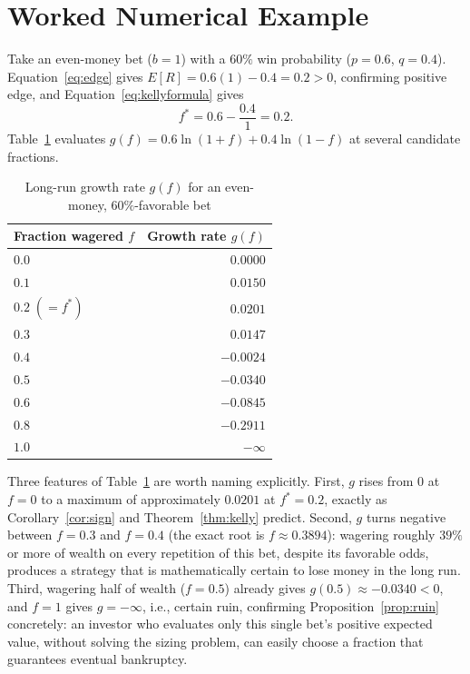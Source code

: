 \documentclass[11pt]{article}
\theoremstyle{remark}
\theoremstyle{definition}
\begin{document}
\section{Worked Numerical Example}
\label{sec:example}

Take an even-money bet ($b=1$) with a $60\%$ win probability ($p=0.6$, $q=0.4$). Equation~\eqref{eq:edge} gives $E[R] = 0.6(1)-0.4 = 0.2>0$, confirming positive edge, and Equation~\eqref{eq:kellyformula} gives
\begin{equation}
f^{*} = 0.6 - \frac{0.4}{1} = 0.2.
\end{equation}
Table~\ref{tab:growth} evaluates $g(f) = 0.6\ln(1+f) + 0.4\ln(1-f)$ at several candidate fractions.

\begin{table}[htbp]
\centering
\caption{Long-run growth rate $g(f)$ for an even-money, $60\%$-favorable bet}
\label{tab:growth}
\begin{tabular}{@{}lr@{}}
\toprule
Fraction wagered $f$ & Growth rate $g(f)$ \\
\midrule
$0.0$ & $0.0000$ \\
$0.1$ & $0.0150$ \\
$0.2\;(=f^{*})$ & $0.0201$ \\
$0.3$ & $0.0147$ \\
$0.4$ & $-0.0024$ \\
$0.5$ & $-0.0340$ \\
$0.6$ & $-0.0845$ \\
$0.8$ & $-0.2911$ \\
$1.0$ & $-\infty$ \\
\bottomrule
\end{tabular}
\end{table}

Three features of Table~\ref{tab:growth} are worth naming explicitly. First, $g$ rises from $0$ at $f=0$ to a maximum of approximately $0.0201$ at $f^{*}=0.2$, exactly as Corollary~\ref{cor:sign} and Theorem~\ref{thm:kelly} predict. Second, $g$ turns negative between $f=0.3$ and $f=0.4$ (the exact root is $f\approx0.3894$): wagering roughly $39\%$ or more of wealth on every repetition of this bet, despite its favorable odds, produces a strategy that is mathematically certain to lose money in the long run. Third, wagering half of wealth ($f=0.5$) already gives $g(0.5)\approx-0.0340<0$, and $f=1$ gives $g=-\infty$, i.e., certain ruin, confirming Proposition~\ref{prop:ruin} concretely: an investor who evaluates only this single bet's positive expected value, without solving the sizing problem, can easily choose a fraction that guarantees eventual bankruptcy.
\end{document}
